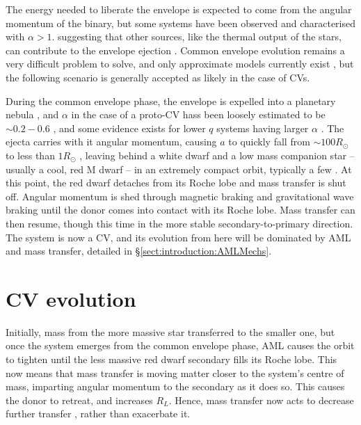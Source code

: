 The energy needed to liberate the envelope is expected to come from the angular momentum of the binary, but some systems have been observed and characterised with $\alpha > 1$. suggesting that other sources, like the thermal output of the stars, can contribute to the envelope ejection \citep{demarco2011, ivanova2013}. Common envelope evolution remains a very difficult problem to solve, and only approximate models currently exist \citep{ivanova2020}, but the following scenario is generally accepted as likely in the case of CVs.

During the common envelope phase, the envelope is expelled into a planetary nebula \citep{Ritter2012}, and $\alpha$ in the case of a proto-CV hass been loosely estimated to be $\sim 0.2 - 0.6$ \citep{politano2007}, and some evidence exists for lower $q$ systems having larger $\alpha$ \citep{passy2013}. The ejecta carries with it angular momentum, causing $a$ to quickly fall from $\sim 100 R_\odot$ to less than $1 R_\odot$ \citep{Ritter2012}, leaving behind a white dwarf and a low mass companion star -- usually a cool, red M dwarf -- in an extremely compact orbit, typically a few \Rsun. At this point, the red dwarf detaches from its Roche lobe and mass transfer is shut off. Angular momentum is shed through magnetic braking and gravitational wave braking until the donor comes into contact with its Roche lobe. Mass transfer can then resume, though this time in the more stable secondary-to-primary direction. The system is now a CV, and its evolution from here will be dominated by AML and mass transfer, detailed in \S\ref{sect:introduction:AMLMechs}.


\section{CV evolution}
\label{sect:introduction:Summary of how AML and Mdot drive period evolution}

Initially, mass from the more massive star transferred to the smaller one, but once the system emerges from the common envelope phase, AML causes the orbit to tighten until the less massive red dwarf secondary fills its Roche lobe. This now means that mass transfer is moving matter closer to the system's centre of mass, imparting angular momentum to the secondary as it does so. This causes the donor to retreat, and increases $R_L$. Hence, mass transfer now acts to decrease further transfer \citep{Ritter2008}, rather than exacerbate it.

